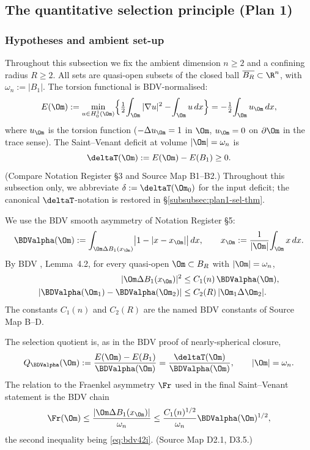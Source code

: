 \subsection{The quantitative selection principle (Plan 1)}
\label{subsec:plan1-selection}

\subsubsection{Hypotheses and ambient set-up}
\label{subsubsec:plan1-sel-setup}

Throughout this subsection we fix the ambient dimension $n\ge2$ and a
confining radius $R\ge2$. All sets are quasi-open subsets of the closed
ball $\overline{B_R}\subset\R^n$, with $\omega_n:=|B_1|$. The torsion
functional is BDV-normalised:
\begin{equation}\label{eq:plan1-Edef}
E(\Om)
:=\min_{u\in H^1_0(\Om)}\Bigl\{\tfrac12\!\int_\Om|\nabla u|^2-\!\int_\Om u\,dx\Bigr\}
=-\tfrac12\!\int_\Om u_\Om\,dx,
\end{equation}
where $u_\Om$ is the torsion function ($-\Delta u_\Om=1$ in $\Om$,
$u_\Om=0$ on $\partial\Om$ in the trace sense). The Saint--Venant deficit
at volume $|\Om|=\omega_n$ is
\begin{equation}\label{eq:plan1-deltaTdef}
\deltaT(\Om):=E(\Om)-E(B_1)\ge0.
\end{equation}
(Compare Notation Register \S3 and Source Map B1--B2.) Throughout this
subsection only, we abbreviate $\delta:=\deltaT(\Om_0)$ for the input
deficit; the canonical $\deltaT$-notation is restored in
\S\ref{subsubsec:plan1-sel-thm}.

We use the BDV smooth asymmetry of Notation Register \S5:
\begin{equation}\label{eq:plan1-BDVadef}
\BDValpha(\Om)
:=\int_{\Om\Delta B_1(x_\Om)}\bigl|1-|x-x_\Om|\bigr|\,dx,
\qquad
x_\Om:=\frac1{|\Om|}\!\int_\Om x\,dx.
\end{equation}
By BDV \cite{BDV}, Lemma~4.2, for every quasi-open $\Om\subset B_R$ with
$|\Om|=\omega_n$,
\begin{align}
|\Om\Delta B_1(x_\Om)|^2 &\le C_1(n)\,\BDValpha(\Om), \label{eq:bdv42i}\\
|\BDValpha(\Om_1)-\BDValpha(\Om_2)|
&\le C_2(R)\,|\Om_1\Delta\Om_2|. \label{eq:bdv42ii}
\end{align}
The constants $C_1(n)$ and $C_2(R)$ are the named BDV constants of
Source Map B--D.

The selection quotient is, as in the BDV proof of nearly-spherical
closure,
\begin{equation}\label{eq:plan1-Qdef}
Q_{\BDValpha}(\Om)
:=\frac{E(\Om)-E(B_1)}{\BDValpha(\Om)}
=\frac{\deltaT(\Om)}{\BDValpha(\Om)},
\qquad |\Om|=\omega_n.
\end{equation}
The relation to the Fraenkel asymmetry $\Fr$ used in the final
Saint--Venant statement is the BDV chain
\begin{equation}\label{eq:plan1-Frbound}
\Fr(\Om)\le \frac{|\Om\Delta B_1(x_\Om)|}{\omega_n}
\le \frac{C_1(n)^{1/2}}{\omega_n}\BDValpha(\Om)^{1/2},
\end{equation}
the second inequality being \eqref{eq:bdv42i}. (Source Map D2.1, D3.5.)


